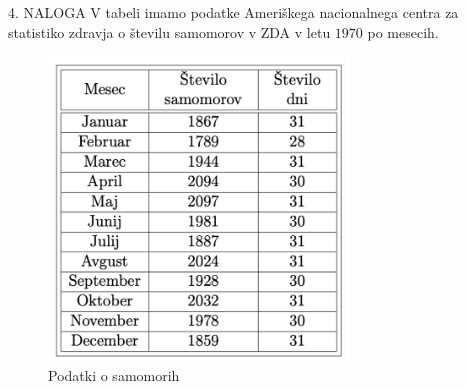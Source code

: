 \documentclass[a4paper,12pt]{article}
\begin{document}
\newpage
\noindent
\textsc{\large{4. NALOGA}}
V tabeli imamo podatke Ameriškega nacionalnega centra za statistiko zdravja o številu samomorov v ZDA v letu $1970$ po mesecih.

\begin{figure}[ht!]
    \centering
    \includegraphics[width=80mm]{samomori.png}
    \caption{Podatki o samomorih}
\end{figure}
\end{document}
